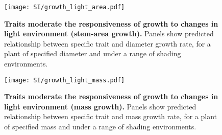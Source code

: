 \documentclass[10pt,twoside]{article}\usepackage[]{graphicx}\usepackage[]{color}
\begin{document}
\newpage


\begin{figure}[ht]
\centering
\texttt{[image: SI/growth\_light\_area.pdf]}
\caption{\textbf{Traits moderate the responsiveness of growth to changes
in light environment (stem-area growth).} Panels show predicted relationship between specific trait and diameter growth rate, for a plant of specified
diameter and under a range of shading environments.
\label{fig:growth_light_area}}
\end{figure}


\newpage

\begin{figure}[ht]
\centering
\texttt{[image: SI/growth\_light\_mass.pdf]}
\caption{\textbf{Traits moderate the responsiveness of growth to changes
in light environment (mass growth).} Panels show predicted relationship between
specific trait and mass growth rate, for a plant of specified
mass and under a range of shading environments.
\label{fig:growth_light_mass}}
\end{figure}

\newpage



\clearpage


\end{document}
